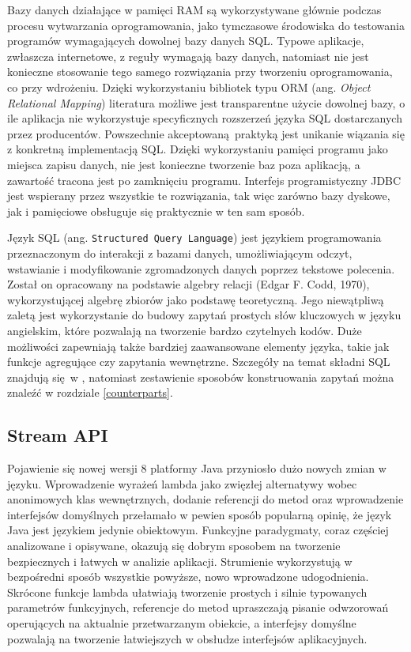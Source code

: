 \documentclass[12pt,twoside,openright]{extarticle}
\begin{document}
      Bazy danych działające w pamięci RAM są wykorzystywane głównie podczas procesu wytwarzania oprogramowania, jako tymczasowe środowiska do testowania programów wymagających dowolnej bazy danych SQL. Typowe aplikacje, zwłaszcza internetowe, z reguły wymagają bazy danych, natomiast nie jest konieczne stosowanie tego samego rozwiązania przy tworzeniu oprogramowania, co przy wdrożeniu. Dzięki wykorzystaniu bibliotek typu ORM \cite{orm} (ang. \textit{Object Relational Mapping}) literatura możliwe jest transparentne użycie dowolnej bazy, o ile aplikacja nie wykorzystuje specyficznych rozszerzeń języka SQL dostarczanych przez producentów. Powszechnie akceptowaną praktyką jest unikanie wiązania się z konkretną implementacją SQL. Dzięki wykorzystaniu pamięci programu jako miejsca zapisu danych, nie jest konieczne tworzenie baz poza aplikacją, a zawartość tracona jest po zamknięciu programu. Interfejs programistyczny JDBC jest wspierany przez wszystkie te rozwiązania, tak więc zarówno bazy dyskowe, jak i pamięciowe obsługuje się praktycznie w ten sam sposób. 

      Język SQL (ang. \texttt{Structured Query Language}) jest językiem programowania przeznaczonym do interakcji z bazami danych, umożliwiającym odczyt, wstawianie i modyfikowanie zgromadzonych danych poprzez tekstowe polecenia. Został on opracowany na podstawie algebry relacji (Edgar F. Codd, 1970), wykorzystującej algebrę zbiorów jako podstawę teoretyczną. Jego niewątpliwą zaletą jest wykorzystanie do budowy zapytań prostych słów kluczowych w języku angielskim, które pozwalają na tworzenie bardzo czytelnych kodów. Duże możliwości zapewniają także bardziej zaawansowane elementy języka, takie jak funkcje agregujące czy zapytania wewnętrzne. Szczegóły na temat składni SQL znajdują się w \cite{ullman}, natomiast zestawienie sposobów konstruowania zapytań można znaleźć w rozdziale \ref{counterparts}.


\subsection{Stream API}

    Pojawienie się nowej wersji 8 platformy Java przyniosło dużo nowych zmian w języku. Wprowadzenie wyrażeń lambda jako zwięzłej alternatywy wobec anonimowych klas wewnętrznych, dodanie referencji do metod oraz wprowadzenie interfejsów domyślnych przełamało w pewien sposób popularną opinię, że język Java jest językiem jedynie obiektowym. Funkcyjne paradygmaty, coraz częściej analizowane i opisywane, okazują się dobrym sposobem na tworzenie bezpiecznych i łatwych w analizie aplikacji. Strumienie wykorzystują w bezpośredni sposób wszystkie powyższe, nowo wprowadzone udogodnienia. Skrócone funkcje lambda ułatwiają tworzenie prostych i silnie typowanych parametrów funkcyjnych, referencje do metod upraszczają pisanie odwzorowań operujących na aktualnie przetwarzanym obiekcie, a interfejsy domyślne pozwalają na tworzenie łatwiejszych w obsłudze interfejsów aplikacyjnych.
\end{document}
